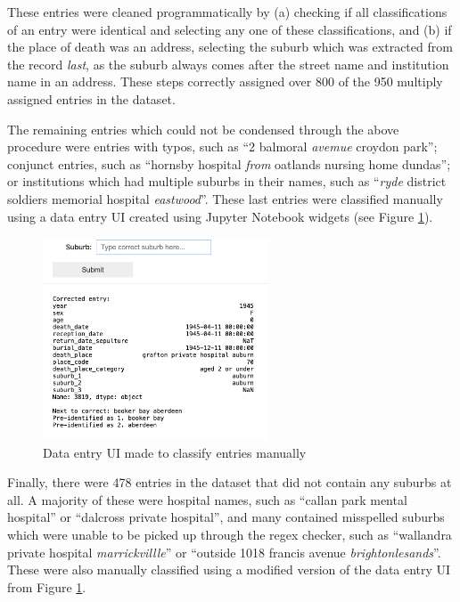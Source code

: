 These entries were cleaned programmatically by (a) checking if all classifications of an entry were identical and selecting any one of these classifications, and (b) if the place of death was an address, selecting the suburb which was extracted from the record \textit{last}, as the suburb always comes after the street name and institution name in an address. These steps correctly assigned over 800 of the 950 multiply assigned entries in the dataset.

The remaining entries which could not be condensed through the above procedure were entries with typos, such as ``2 balmoral \textit{avemue} croydon park''; conjunct entries, such as ``hornsby hospital \textit{from} oatlands nursing home dundas''; or institutions which had multiple suburbs in their names, such as ``\textit{ryde} district soldiers memorial hospital \textit{eastwood}''. These last entries were classified manually using a data entry UI created using Jupyter Notebook widgets (see Figure \ref{fig:data-entry-ui}).

\begin{figure}
    \centering
    \caption{Data entry UI made to classify entries manually}
    \label{fig:data-entry-ui}
    \includegraphics[width=0.6\textwidth]{REPORT/img/data_entry_ui.png}
\end{figure}

Finally, there were 478 entries in the dataset that did not contain any suburbs at all. A majority of these were hospital names, such as ``callan park mental hospital'' or ``dalcross private hospital'', and many contained misspelled suburbs which were unable to be picked up through the regex checker, such as ``wallandra private hospital \textit{marrickvillle}'' or ``outside 1018 francis avenue \textit{brightonlesands}''. These were also manually classified using a modified version of the data entry UI from Figure \ref{fig:data-entry-ui}.

